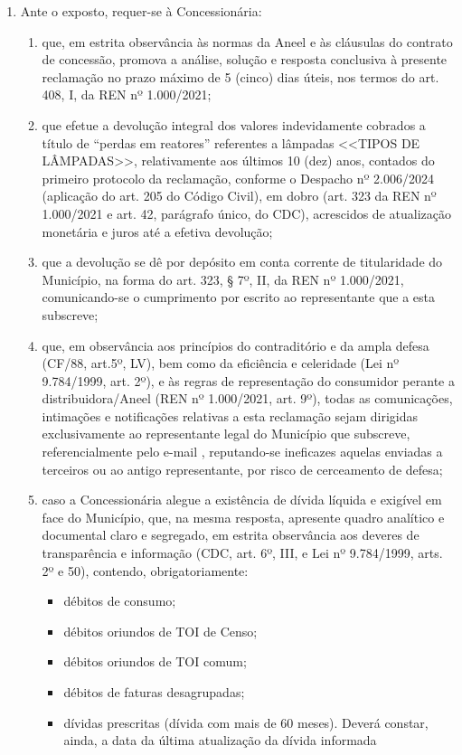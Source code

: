 \begin{enumerate}[resume]

\item
Ante o exposto, requer-se à Concessionária: 

\begin{enumerate}
    \item que, em estrita observância às normas da Aneel e às cláusulas do contrato de concessão, promova a análise, solução e resposta conclusiva à presente reclamação no prazo máximo de 5 (cinco) dias úteis, nos termos do art. 408, I, da REN nº 1.000/2021;
    \item  que efetue a devolução integral dos valores indevidamente cobrados a título de “perdas em reatores” referentes a lâmpadas <<TIPOS DE LÂMPADAS>>, relativamente aos últimos 10 (dez) anos, contados do primeiro protocolo da reclamação, conforme o Despacho nº 2.006/2024 (aplicação do art. 205 do Código Civil), em dobro (art. 323 da REN nº 1.000/2021 e art. 42, parágrafo único, do CDC), acrescidos de atualização monetária e juros até a efetiva devolução; 
    \item que a devolução se dê por depósito em conta corrente de titularidade do Município, na forma do art. 323, § 7º, II, da REN nº 1.000/2021, comunicando-se o cumprimento por escrito ao representante que a esta subscreve; 
    \item que, em observância aos princípios do contraditório e da ampla defesa (CF/88, art.5º, LV), bem como da eficiência e celeridade (Lei nº 9.784/1999, art. 2º), e às regras de representação do consumidor perante a distribuidora/Aneel (REN nº 1.000/2021, art. 9º), todas as comunicações, intimações e notificações relativas a esta reclamação sejam dirigidas exclusivamente ao representante legal do Município que subscreve, referencialmente pelo e-mail \emailEmpresa{} , reputando-se ineficazes aquelas enviadas a terceiros ou ao antigo representante, por risco de cerceamento de defesa;
    \item caso a Concessionária alegue a existência de dívida líquida e exigível em face do Município, que, na mesma resposta, apresente quadro analítico e documental claro e segregado, em estrita observância aos deveres de transparência e informação (CDC, art. 6º, III, e Lei nº 9.784/1999, arts. 2º e 50), contendo, obrigatoriamente: 
    \begin{itemize}
        \item débitos de consumo; 
        \item débitos oriundos de TOI de Censo;
        \item débitos oriundos de TOI comum; 
        \item débitos de faturas desagrupadas; 
        \item dívidas prescritas (dívida com mais de 60 meses). Deverá constar, ainda, a data da última atualização da dívida informada 
    \end{itemize}
\end{enumerate}


\end{enumerate}